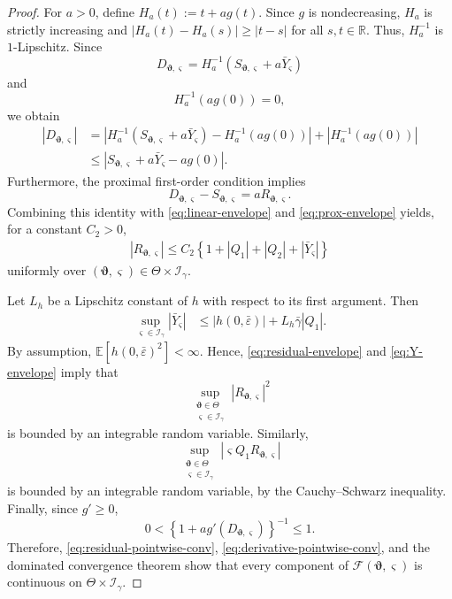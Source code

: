 \documentclass[10pt,a4paper]{amsart}
\begin{document}
\begin{proof}
For $a>0$, define $H_a(t):=t+a g(t).$
Since $g$ is nondecreasing, $H_a$ is strictly increasing and $|H_a(t)-H_a(s)|\ge |t-s|$ for all $s,t\in\mathbb{R}.$
Thus, $H_a^{-1}$ is $1$-Lipschitz. Since
\[
D_{\bm\vartheta,\varsigma}
=
H_a^{-1}\left(S_{\bm\vartheta,\varsigma}+a\bar Y_{\varsigma}\right)
\]
and
\[
H_a^{-1}(a g(0))=0,
\]
we obtain
\begin{align}
|D_{\bm\vartheta,\varsigma}|
&=|H_a^{-1}\left(S_{\bm\vartheta,\varsigma}+a\bar Y_{\varsigma}\right)-H_a^{-1}\left(ag(0)\right)|+|H_a^{-1}\left(ag(0)\right)| \\
&\le
\left|
S_{\bm\vartheta,\varsigma}+a\bar Y_{\varsigma}-a g(0)
\right|.
\label{eq:prox-envelope}
\end{align}
Furthermore, the proximal first-order condition implies
\[
D_{\bm\vartheta,\varsigma}-S_{\bm\vartheta,\varsigma}
=aR_{\bm\vartheta,\varsigma}.
\]
Combining this identity with \eqref{eq:linear-envelope} and
\eqref{eq:prox-envelope} yields, for a constant $C_2>0$,
\begin{align}
|R_{\bm\vartheta,\varsigma}|
\le
C_2
\left\{
1+|Q_1|+|Q_2|+|\bar Y_{\varsigma}|
\right\}
\label{eq:residual-envelope}
\end{align}
uniformly over
$(\bm\vartheta,\varsigma)
\in\Theta\times\mathcal I_\gamma$.

Let $L_h$ be a Lipschitz constant of $h$ with respect to its first
argument. Then
\begin{align}
\sup_{\varsigma\in\mathcal I_\gamma}
|\bar Y_{\varsigma}|
&\le
|h(0,\bar\varepsilon)|
+
L_h\bar\gamma |Q_1|.
\label{eq:Y-envelope}
\end{align}
By assumption, $\mathbb{E}\left[
h(0,\bar\varepsilon)^2
\right]<\infty.$
Hence, \eqref{eq:residual-envelope} and \eqref{eq:Y-envelope} imply that
\[
\sup_{\substack{
\bm\vartheta\in\Theta\\
\varsigma\in\mathcal I_\gamma
}}
|R_{\bm\vartheta,\varsigma}|^2
\]
is bounded by an integrable random variable. Similarly,
\[
\sup_{\substack{
\bm\vartheta\in\Theta\\
\varsigma\in\mathcal I_\gamma
}}
\left|
\varsigma Q_1R_{\bm\vartheta,\varsigma}
\right|
\]
is bounded by an integrable random variable, by the Cauchy--Schwarz
inequality. Finally, since $g'\ge0$,
\[
0<
\left\{
1+a g'(D_{\bm\vartheta,\varsigma})
\right\}^{-1}
\le1.
\]
Therefore, \eqref{eq:residual-pointwise-conv},
\eqref{eq:derivative-pointwise-conv}, and the dominated convergence theorem
show that every component of
$\mathcal F(\bm\vartheta,\varsigma)$ is continuous on
$\Theta\times\mathcal I_\gamma$.


\end{proof}
\end{document}

